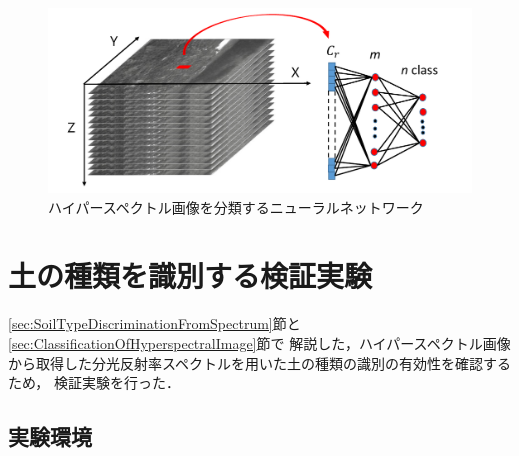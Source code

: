 

\begin{figure}[p]
	\begin{center}
	\centering
	\includegraphics[width=13cm]{./Ch3_SoilTypeDiscrimination/Fig/neuralnetwork_for_hyperspectralimage_compressed.pdf}
	\caption{ハイパースペクトル画像を分類するニューラルネットワーク}\label{fig:neuralnetwork}
	\end{center}
\end{figure}

\clearpage


\section{土の種類を識別する検証実験}
\label{sec:PreliminaryExperimentOfDiscrimination}

\ref{sec:SoilTypeDiscriminationFromSpectrum}節と\ref{sec:ClassificationOfHyperspectralImage}節で
解説した，ハイパースペクトル画像から取得した分光反射率スペクトルを用いた土の種類の識別の有効性を確認するため，
検証実験を行った．

\subsection{実験環境}
\label{ssec:DiscriminationExperimentSetting}

